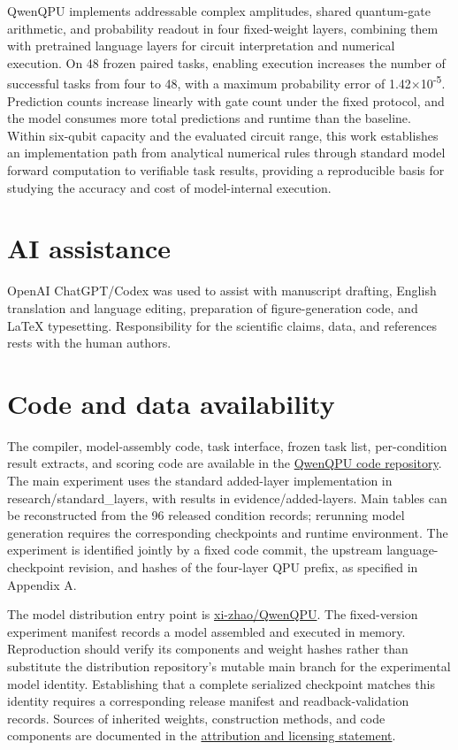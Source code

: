 \documentclass[11pt,a4paper]{article}
\begin{document}
QwenQPU implements addressable complex amplitudes, shared quantum-gate arithmetic, and probability readout in four fixed-weight layers, combining them with pretrained language layers for circuit interpretation and numerical execution. On 48 frozen paired tasks, enabling execution increases the number of successful tasks from four to 48, with a maximum probability error of 1.42\ensuremath{\times}10\textsuperscript{-5}. Prediction counts increase linearly with gate count under the fixed protocol, and the model consumes more total predictions and runtime than the baseline. Within six-qubit capacity and the evaluated circuit range, this work establishes an implementation path from analytical numerical rules through standard model forward computation to verifiable task results, providing a reproducible basis for studying the accuracy and cost of model-internal execution.

\section*{AI assistance}

OpenAI ChatGPT/Codex was used to assist with manuscript drafting, English translation and language editing, preparation of figure-generation code, and LaTeX typesetting. Responsibility for the scientific claims, data, and references rests with the human authors.

\section*{Code and data availability}

The compiler, model-assembly code, task interface, frozen task list, per-condition result extracts, and scoring code are available in the \href{https://github.com/xi-zhao/QwenQPU/tree/caae45327b46458163d0840a4c1466e5575a7b4f}{QwenQPU code repository}. The main experiment uses the standard added-layer implementation in research/standard\_layers, with results in evidence/added-layers. Main tables can be reconstructed from the 96 released condition records; rerunning model generation requires the corresponding checkpoints and runtime environment. The experiment is identified jointly by a fixed code commit, the upstream language-checkpoint revision, and hashes of the four-layer QPU prefix, as specified in Appendix A.

The model distribution entry point is \href{https://huggingface.co/xi-zhao/QwenQPU}{xi-zhao/QwenQPU}. The fixed-version experiment manifest records a model assembled and executed in memory. Reproduction should verify its components and weight hashes rather than substitute the distribution repository's mutable main branch for the experimental model identity. Establishing that a complete serialized checkpoint matches this identity requires a corresponding release manifest and readback-validation records. Sources of inherited weights, construction methods, and code components are documented in the \href{https://github.com/xi-zhao/QwenQPU/blob/caae45327b46458163d0840a4c1466e5575a7b4f/docs/LICENSES.md}{attribution and licensing statement}.
\end{document}
